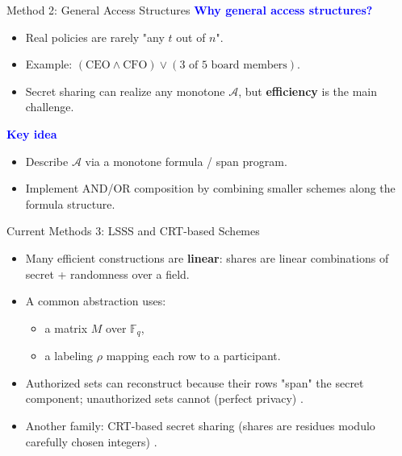 \begin{frame}{Method 2: General Access Structures \cite{beimel2011secret}}
	\textbf{\textcolor{blue}{Why general access structures?}}
	\begin{itemize}
		\item Real policies are rarely "any \(t\) out of \(n\)".
		\item Example: \((\text{CEO} \wedge \text{CFO}) \vee (\text{3 of 5 board members})\).
		\item Secret sharing can realize any monotone \(\mathcal{A}\), but \textbf{efficiency} is the main challenge.
	\end{itemize}

	\textbf{\textcolor{blue}{Key idea}}
	\begin{itemize}
		\item Describe \(\mathcal{A}\) via a monotone formula / span program.
		\item Implement AND/OR composition by combining smaller schemes along the formula structure.
	\end{itemize}
\end{frame}

\begin{frame}{Current Methods 3: LSSS and CRT-based Schemes}
	\begin{itemize}
		\item Many efficient constructions are \textbf{linear}: shares are linear combinations of secret + randomness over a field.
		\item A common abstraction uses:
			\begin{itemize}
				\item a matrix \(M\) over \(\mathbb{F}_q\),
				\item a labeling \(\rho\) mapping each row to a participant.
			\end{itemize}
		\item Authorized sets can reconstruct because their rows "span" the secret component; unauthorized sets cannot (perfect privacy) \cite{beimel2011secret}.
		\item Another family: CRT-based secret sharing (shares are residues modulo carefully chosen integers) \cite{iftene2007general}.
	\end{itemize}
\end{frame}
